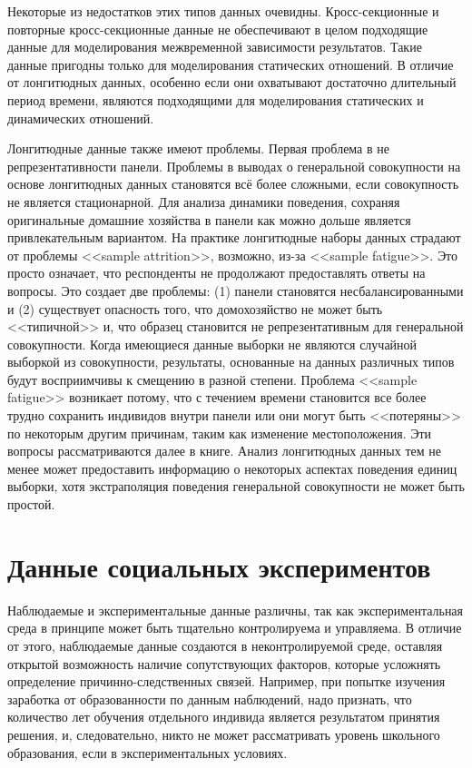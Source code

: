 Некоторые из недостатков этих типов данных очевидны. Кросс-секционные и повторные кросс-секционные данные не обеспечивают в целом подходящие данные для моделирования межвременной зависимости результатов. Такие данные пригодны только для моделирования статических отношений. В отличие от лонгитюдных данных, особенно если они охватывают достаточно длительный период времени, являются подходящими для моделирования статических и динамических отношений.


Лонгитюдные данные также имеют проблемы. Первая проблема в  не репрезентативности панели. Проблемы в выводах о генеральной совокупности на основе лонгитюдных данных становятся всё более сложными, если совокупность не является стационарной. Для анализа динамики поведения, сохраняя оригинальные домашние хозяйства в панели как можно дольше является привлекательным вариантом. На практике лонгитюдные наборы данных страдают от проблемы <<sample attrition>>, возможно, из-за <<sample fatigue>>. Это просто означает, что респонденты не продолжают предоставлять ответы на вопросы. Это создает две проблемы: (1) панели становятся несбалансированными и (2) существует опасность того, что домохозяйство не может быть <<типичной>> и, что образец становится не репрезентативным для генеральной совокупности. Когда имеющиеся данные выборки не являются случайной выборкой из совокупности, результаты, основанные на данных различных типов будут восприимчивы к смещению в разной степени. Проблема <<sample fatigue>> возникает потому, что с течением времени становится все более трудно сохранить индивидов внутри панели или они могут быть <<потеряны>> по некоторым другим причинам, таким как изменение местоположения. Эти вопросы рассматриваются далее в книге. Анализ лонгитюдных данных тем не менее может предоставить информацию о некоторых аспектах поведения единиц выборки, хотя экстраполяция поведения генеральной совокупности не может быть простой.


\section{Данные социальных экспериментов}

Наблюдаемые и экспериментальные данные различны, так как экспериментальная среда в принципе может быть тщательно контролируема и управляема. В отличие от этого, наблюдаемые данные создаются в неконтролируемой среде, оставляя открытой возможность наличие сопутствующих факторов, которые усложнять определение причинно-следственных связей. Например, при попытке изучения заработка  от образованности по данным наблюдений, надо признать, что количество лет обучения отдельного индивида является результатом принятия решения, и, следовательно, никто не может рассматривать уровень школьного образования, если в экспериментальных условиях.


